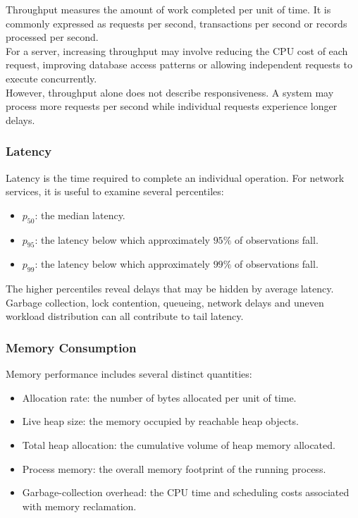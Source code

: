 Throughput measures the amount of work completed per unit of time. It is commonly expressed as requests per second, transactions per second or records processed per second.\\

For a server, increasing throughput may involve reducing the CPU cost of each request, improving database access patterns or allowing independent requests to execute concurrently.\\

However, throughput alone does not describe responsiveness. A system may process more requests per second while individual requests experience longer delays.

\subsubsection{Latency}

Latency is the time required to complete an individual operation. For network services, it is useful to examine several percentiles:

\begin{itemize}
    \item \(p_{50}\): the median latency.
    \item \(p_{95}\): the latency below which approximately \(95\%\) of observations fall.
    \item \(p_{99}\): the latency below which approximately \(99\%\) of observations fall.
\end{itemize}

The higher percentiles reveal delays that may be hidden by average latency. Garbage collection, lock contention, queueing, network delays and uneven workload distribution can all contribute to tail latency.

\subsubsection{Memory Consumption}

Memory performance includes several distinct quantities:

\begin{itemize}
    \item Allocation rate: the number of bytes allocated per unit of time.
    \item Live heap size: the memory occupied by reachable heap objects.
    \item Total heap allocation: the cumulative volume of heap memory allocated.
    \item Process memory: the overall memory footprint of the running process.
    \item Garbage-collection overhead: the CPU time and scheduling costs associated with memory reclamation.
\end{itemize}

